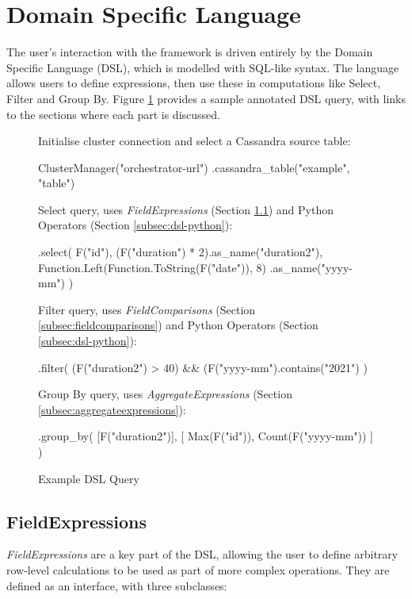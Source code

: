 \section{Domain Specific Language}
The user's interaction with the framework is driven entirely by the Domain Specific Language (DSL), which is modelled with SQL-like syntax. The language allows users to define expressions, then use these in computations like Select, Filter and Group By. Figure \ref{fig:dsl-high-level-example} provides a sample annotated DSL query, with links to the sections where each part is discussed.

\begin{figure}[htp]
	Initialise cluster connection and select a Cassandra source table:
	\begin{python}
ClusterManager("orchestrator-url")
  .cassandra_table("example", "table")
	\end{python}
	
	Select query, uses \textit{FieldExpressions} (Section \ref{subsec:fieldexpressions}) and Python Operators (Section \ref{subsec:dsl-python}):
	\begin{python}
  .select(
    F("id"),
    (F("duration") * 2).as_name("duration2"),
    Function.Left(Function.ToString(F("date")), 8)
      .as_name("yyyy-mm")
  )
	\end{python}

	Filter query, uses \textit{FieldComparisons} (Section \ref{subsec:fieldcomparisons}) and Python Operators (Section \ref{subsec:dsl-python}):
	\begin{python}
  .filter(
    (F("duration2") > 40) && 
  	(F("yyyy-mm").contains("2021")
  )
	\end{python}

	Group By query, uses \textit{AggregateExpressions} (Section \ref{subsec:aggregateexpressions}):
	\begin{python}
  .group_by(
    [F("duration2")],
    [
      Max(F("id")),
      Count(F("yyyy-mm"))
    ]
  )
	\end{python}
	\caption{Example DSL Query}
	\label{fig:dsl-high-level-example}
\end{figure}


\subsection{FieldExpressions}\label{subsec:fieldexpressions}
\textit{FieldExpressions} are a key part of the DSL, allowing the user to define arbitrary row-level calculations to be used as part of more complex operations. They are defined as an interface, with three subclasses:

